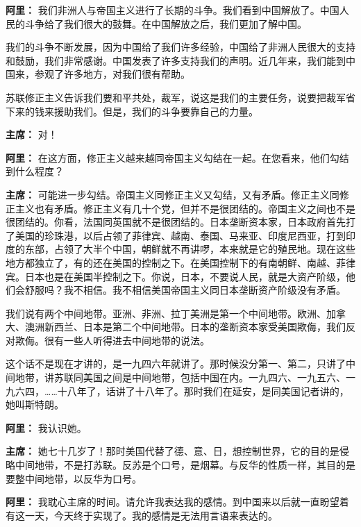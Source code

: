 \begin{list}{}
\item[\textbf{阿里：}] 我们非洲人与帝国主义进行了长期的斗争。我们看到中国解放了。中国人民的斗争给了我们很大的鼓舞。在中国解放之后，我们更加了解中国。

我们的斗争不断发展，因为中国给了我们许多经验，中国给了非洲人民很大的支持和鼓励，我们非常感谢。中国发表了许多支持我们的声明。近几年来，我们能到中国来，参观了许多地方，对我们很有帮助。

苏联修正主义告诉我们要和平共处，裁军，说这是我们的主要任务，说要把裁军省下来的钱来援助我们。但是，我们的斗争要靠自己的力量。

\item[\textbf{主席：}] 对！

\item[\textbf{阿里：}] 在这方面，修正主义越来越同帝国主义勾结在一起。在您看来，他们勾结到什么程度？

\item[\textbf{主席：}] 可能进一步勾结。帝国主义同修正主义又勾结，又有矛盾。修正主义同修正主义也有矛盾。修正主义有几十个党，但并不是很团结的。帝国主义之间也不是很团结的。你看，法国同英国就不是很团结的。日本垄断资本家，日本政府首先打了美国的珍珠港，以后占领了菲律宾、越南、泰国、马来亚、印度尼西亚，打到印度的东部，占领了大半个中国，朝鲜就不再讲啰，本来就是它的殖民地。现在这些地方都独立了，有的还在美国的控制之下。在美国控制下的有南朝鲜、南越、菲律宾。日本也是在美国半控制之下。你说，日本，不要说人民，就是大资产阶级，他们会舒服吗？我不相信。我不相信美国帝国主义同日本垄断资产阶级没有矛盾。

我们说有两个中间地带。亚洲、非洲、拉丁美洲是第一个中间地带。欧洲、加拿大、澳洲新西兰、日本是第二个中间地带。日本的垄断资本家受美国欺侮，我们反对欺侮。很有一些人听得进去中间地带的说法。

这个话不是现在才讲的，是一九四六年就讲了。那时候没分第一、第二，只讲了中间地带，讲苏联同美国之间是中间地带，包括中国在内。一九四六、一九五六、一九六四，……十八年了，话讲了十八年了。那时我们在延安，是同美国记者讲的，她叫斯特朗。

\item[\textbf{阿里：}] 我认识她。

\item[\textbf{主席：}] 她七十几岁了！那时美国代替了德、意、日，想控制世界，它的目的是侵略中间地带，不是打苏联。反苏是个口号，是烟幕。与反华的性质一样，其目的是要整中间地带，以反华为口号。

\item[\textbf{阿里：}] 我耽心主席的时间。请允许我表达我的感情。到中国来以后就一直盼望着有这一天，今天终于实现了。我的感情是无法用言语来表达的。


\end{list}

